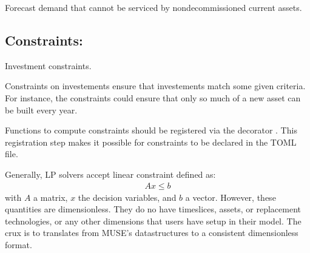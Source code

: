 \documentclass[letterpaper,10pt,english]{sphinxmanual}
\begin{document}

\begin{fulllineitems}
\label{\detokenize{api:muse.demand_share.unmet_forecasted_demand}}
Forecast demand that cannot be serviced by non\sphinxhyphen{}decommissioned current assets.

\end{fulllineitems}



\subsection{Constraints:}
\label{\detokenize{api:module-muse.constraints}}\label{\detokenize{api:constraints}}
Investment constraints.

Constraints on investements ensure that investements match some given criteria. For
instance, the constraints could ensure that only so much of a new asset can be built
every year.

Functions to compute constraints should be registered via the decorator
. This registration step makes it
possible for constraints to be declared in the TOML file.

Generally, LP solvers accept linear constraint defined as:
\begin{equation*}
\begin{split}A x \leq b\end{split}
\end{equation*}
with \(A\) a matrix, \(x\) the decision variables, and \(b\) a vector.
However, these quantities are dimensionless. They do no have timeslices, assets, or
replacement technologies, or any other dimensions that users have set\sphinxhyphen{}up in their model.
The crux is to translates from MUSE’s data\sphinxhyphen{}structures to a consistent dimensionless
format.
\end{document}
